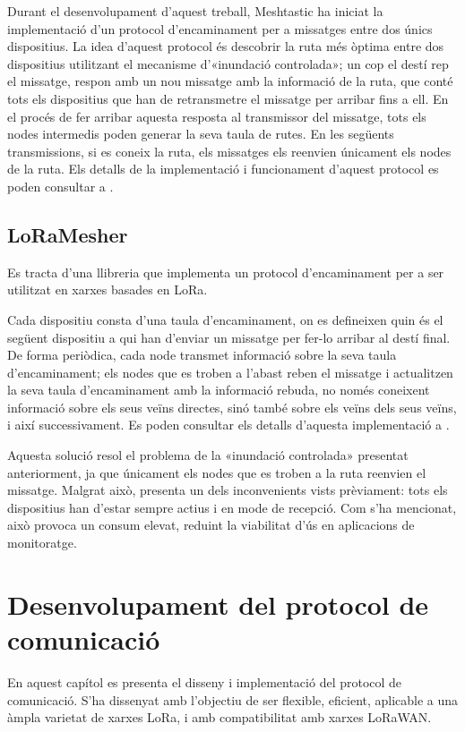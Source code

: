 \documentclass{tfgitic}[2024/07/01]
\begin{document}
Durant el desenvolupament d'aquest treball, Meshtastic ha iniciat la implementació d'un protocol d'encaminament per a missatges entre dos únics dispositius. La idea d'aquest protocol és descobrir la ruta més òptima entre dos dispositius utilitzant el mecanisme d'«inundació controlada»; un cop el destí rep el missatge, respon amb un nou missatge amb la informació de la ruta, que conté tots els dispositius que han de retransmetre el missatge per arribar fins a ell. En el procés de fer arribar aquesta resposta al transmissor del missatge, tots els nodes intermedis poden generar la seva taula de rutes. En les següents transmissions, si es coneix la ruta, els missatges els reenvien únicament els nodes de la ruta. Els detalls de la implementació i funcionament d'aquest protocol es poden consultar a \cite{open_source_mesh_nodate}.

\section{LoRaMesher}
Es tracta d'una llibreria que implementa un protocol d'encaminament per a ser utilitzat en xarxes basades en LoRa. 

Cada dispositiu consta d'una taula d'encaminament, on es defineixen quin és el següent dispositiu a qui han d'enviar un missatge per fer-lo arribar al destí final. De forma periòdica, cada node transmet informació sobre la seva taula d'encaminament; els nodes que es troben a l'abast reben el missatge i actualitzen la seva taula d'encaminament amb la informació rebuda, no només coneixent informació sobre els seus veïns directes, sinó també sobre els veïns dels seus veïns, i així successivament. Es poden consultar els detalls d'aquesta implementació a \cite{sole_implementation_2022}.

Aquesta solució resol el problema de la «inundació controlada» presentat anteriorment, ja que únicament els nodes que es troben a la ruta reenvien el missatge. Malgrat això, presenta un dels inconvenients vists prèviament: tots els dispositius han d'estar sempre actius i en mode de recepció. Com s'ha mencionat, això provoca un consum elevat, reduint la viabilitat d'ús en aplicacions de monitoratge.

\chapter{Desenvolupament del protocol de comunicació}
En aquest capítol es presenta el disseny i implementació del protocol de comunicació. S'ha dissenyat amb l'objectiu de ser flexible, eficient, aplicable a una àmpla varietat de xarxes LoRa, i amb compatibilitat amb xarxes LoRaWAN. 
\end{document}
